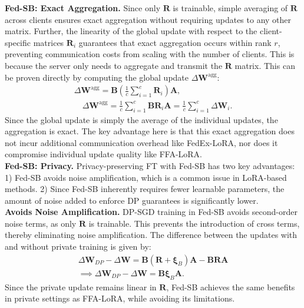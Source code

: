 \textbf{Fed-SB: Exact Aggregation.}
Since only \( \mathbf{R} \) is trainable, simple averaging of \( \mathbf{R} \) across clients ensures exact aggregation without requiring updates to any other matrix. 
Further, the linearity of the global update with respect to the client-specific matrices \( \mathbf{R}_i \) guarantees that exact aggregation occurs within rank \( r \), preventing communication costs from scaling with the number of clients. 
This is because the server only needs to aggregate and transmit the \( \mathbf{R} \) matrix.  
This can be proven directly by computing the global update \( \Delta \mathbf{W}^{\text{agg}} \):  
\begin{gather}
     \Delta \mathbf{W}^{\text{agg}} = \mathbf{B} \left( \frac{1}{c} \sum_{i=1}^{c} \mathbf{R}_i \right) \mathbf{A},\\
    \quad \Delta \mathbf{W}^{\text{agg}} = \frac{1}{c} \sum_{i=1}^{c} \mathbf{B} \mathbf{R}_i \mathbf{A} =  \frac{1}{c} \sum_{i=1}^{c} \Delta \mathbf{W}_i  . 
\end{gather}
Since the global update is simply the average of the individual updates, the aggregation is exact. 
The key advantage here is that this exact aggregation does not incur additional communication overhead like FedEx-LoRA, nor does it compromise individual update quality like FFA-LoRA.
\\

\textbf{Fed-SB: Privacy.}  
Privacy-preserving FT with Fed-SB has two key advantages:  
1) Fed-SB avoids noise amplification, which is a common issue in LoRA-based methods.  
2) Since Fed-SB inherently requires fewer learnable parameters, the amount of noise added to enforce DP guarantees is significantly lower.
\\

\textbf{Avoids Noise Amplification.}
DP-SGD training in Fed-SB avoids second-order noise terms, as only \( \mathbf{R} \) is trainable. This prevents the introduction of cross terms, thereby eliminating noise amplification. The difference between the updates with and without private training is given by:  
\begin{multline}
     \Delta \mathbf{W}_{DP} - \Delta \mathbf{W} = \mathbf{B}\left(\mathbf{R} + \boldsymbol{\xi}_B\right)\mathbf{A} - \mathbf{B} \mathbf{R} \mathbf{A}  \\
     \implies \Delta \mathbf{W}_{DP} - \Delta \mathbf{W} =   \mathbf{B} \boldsymbol{\xi}_B \mathbf{A} .
\end{multline}
Since the private update remains linear in \( \mathbf{R} \), Fed-SB achieves the same benefits in private settings as FFA-LoRA, while avoiding its limitations.  
\\

